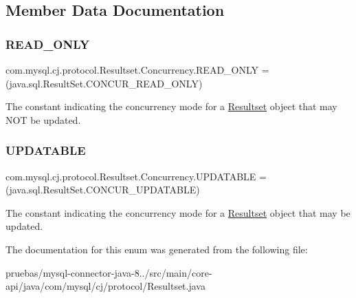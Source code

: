 \subsection{Member Data Documentation}
\mbox{\label{enumcom_1_1mysql_1_1cj_1_1protocol_1_1_resultset_1_1_concurrency_ad95969aa1d11771ceb9081ea8447fc41}} 
\subsubsection{\texorpdfstring{R\+E\+A\+D\+\_\+\+O\+N\+LY}{READ\_ONLY}}
{\footnotesize\ttfamily com.\+mysql.\+cj.\+protocol.\+Resultset.\+Concurrency.\+R\+E\+A\+D\+\_\+\+O\+N\+LY =(java.\+sql.\+Result\+Set.\+C\+O\+N\+C\+U\+R\+\_\+\+R\+E\+A\+D\+\_\+\+O\+N\+LY)}

The constant indicating the concurrency mode for a {\ttfamily \mbox{\hyperlink{interfacecom_1_1mysql_1_1cj_1_1protocol_1_1_resultset}{Resultset}}} object that may N\+OT be updated. \mbox{\label{enumcom_1_1mysql_1_1cj_1_1protocol_1_1_resultset_1_1_concurrency_a1bf39feaaedfbfc0722738fce73d919c}} 
\subsubsection{\texorpdfstring{U\+P\+D\+A\+T\+A\+B\+LE}{UPDATABLE}}
{\footnotesize\ttfamily com.\+mysql.\+cj.\+protocol.\+Resultset.\+Concurrency.\+U\+P\+D\+A\+T\+A\+B\+LE =(java.\+sql.\+Result\+Set.\+C\+O\+N\+C\+U\+R\+\_\+\+U\+P\+D\+A\+T\+A\+B\+LE)}

The constant indicating the concurrency mode for a {\ttfamily \mbox{\hyperlink{interfacecom_1_1mysql_1_1cj_1_1protocol_1_1_resultset}{Resultset}}} object that may be updated. 

The documentation for this enum was generated from the following file\+:\begin{DoxyCompactItemize}
\item 
pruebas/mysql-\/connector-\/java-\/8../src/main/core-\/api/java/com/mysql/cj/protocol/Resultset.\+java\end{DoxyCompactItemize}
